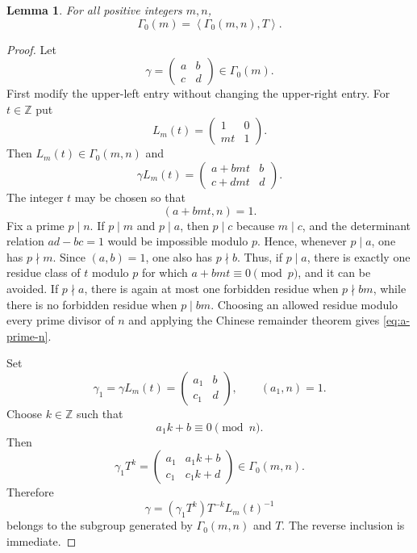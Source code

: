 \documentclass[12pt]{amsart}
\newtheorem{lem}[thm]{Lemma}
\theoremstyle{definition}
\theoremstyle{remark}
\numberwithin{equation}{section}
\newcommand{\Z}{\mathbb Z}
\begin{document}
\begin{lem}\label{lem:generation}
For all positive integers $m,n$,
\begin{equation}\label{eq:generation}
\Gamma_0(m)=\left\langle\Gamma_0(m,n),T\right\rangle.
\end{equation}
\end{lem}

\begin{proof}
Let
\[
\gamma=\begin{pmatrix}a&b\\c&d\end{pmatrix}\in\Gamma_0(m).
\]
First modify the upper-left entry without changing the upper-right entry. For $t\in\Z$ put
\[
L_m(t)=\begin{pmatrix}1&0\\mt&1\end{pmatrix}.
\]
Then $L_m(t)\in\Gamma_0(m,n)$ and
\[
\gamma L_m(t)=
\begin{pmatrix}
a+bmt&b\\c+dmt&d
\end{pmatrix}.
\]
The integer $t$ may be chosen so that
\begin{equation}\label{eq:a-prime-n}
(a+bmt,n)=1.
\end{equation}
Fix a prime $p\mid n$. If $p\mid m$ and $p\mid a$, then $p\mid c$ because $m\mid c$, and the determinant relation $ad-bc=1$ would be impossible modulo $p$. Hence, whenever $p\mid a$, one has $p\nmid m$. Since $(a,b)=1$, one also has $p\nmid b$. Thus, if $p\mid a$, there is exactly one residue class of $t$ modulo $p$ for which $a+bmt\equiv0\pmod p$, and it can be avoided. If $p\nmid a$, there is again at most one forbidden residue when $p\nmid bm$, while there is no forbidden residue when $p\mid bm$. Choosing an allowed residue modulo every prime divisor of $n$ and applying the Chinese remainder theorem gives \eqref{eq:a-prime-n}.

Set
\[
\gamma_1=\gamma L_m(t)=
\begin{pmatrix}a_1&b\\c_1&d\end{pmatrix},
\qquad (a_1,n)=1.
\]
Choose $k\in\Z$ such that
\[
a_1k+b\equiv0\pmod n.
\]
Then
\[
\gamma_1T^k=
\begin{pmatrix}
a_1&a_1k+b\\c_1&c_1k+d
\end{pmatrix}
\in\Gamma_0(m,n).
\]
Therefore
\[
\gamma=(\gamma_1T^k)T^{-k}L_m(t)^{-1}
\]
belongs to the subgroup generated by $\Gamma_0(m,n)$ and $T$. The reverse inclusion is immediate.
\end{proof}
\end{document}
